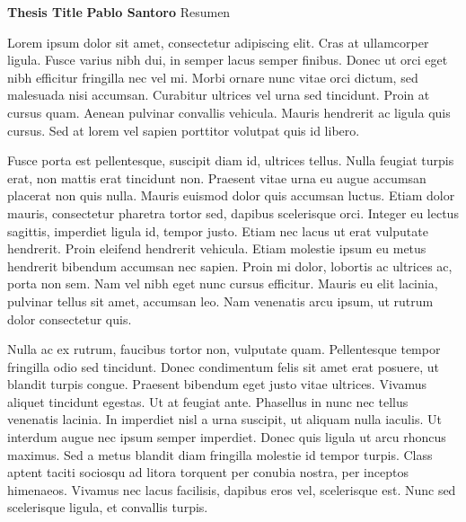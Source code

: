\thispagestyle{plain}
\begin{center}
    \large
    \textbf{Thesis Title}
    \vspace{0.4 cm}
    \textbf{Pablo Santoro}
    \vspace{0.4 cm}
    Resumen
\end{center}
Lorem ipsum dolor sit amet, consectetur adipiscing elit. Cras at ullamcorper ligula. Fusce varius nibh dui, in semper lacus semper finibus. Donec ut orci eget nibh efficitur fringilla nec vel mi. Morbi ornare nunc vitae orci dictum, sed malesuada nisi accumsan. Curabitur ultrices vel urna sed tincidunt. Proin at cursus quam. Aenean pulvinar convallis vehicula. Mauris hendrerit ac ligula quis cursus. Sed at lorem vel sapien porttitor volutpat quis id libero.

Fusce porta est pellentesque, suscipit diam id, ultrices tellus. Nulla feugiat turpis erat, non mattis erat tincidunt non. Praesent vitae urna eu augue accumsan placerat non quis nulla. Mauris euismod dolor quis accumsan luctus. Etiam dolor mauris, consectetur pharetra tortor sed, dapibus scelerisque orci. Integer eu lectus sagittis, imperdiet ligula id, tempor justo. Etiam nec lacus ut erat vulputate hendrerit. Proin eleifend hendrerit vehicula. Etiam molestie ipsum eu metus hendrerit bibendum accumsan nec sapien. Proin mi dolor, lobortis ac ultrices ac, porta non sem. Nam vel nibh eget nunc cursus efficitur. Mauris eu elit lacinia, pulvinar tellus sit amet, accumsan leo. Nam venenatis arcu ipsum, ut rutrum dolor consectetur quis.

Nulla ac ex rutrum, faucibus tortor non, vulputate quam. Pellentesque tempor fringilla odio sed tincidunt. Donec condimentum felis sit amet erat posuere, ut blandit turpis congue. Praesent bibendum eget justo vitae ultrices. Vivamus aliquet tincidunt egestas. Ut at feugiat ante. Phasellus in nunc nec tellus venenatis lacinia. In imperdiet nisl a urna suscipit, ut aliquam nulla iaculis. Ut interdum augue nec ipsum semper imperdiet. Donec quis ligula ut arcu rhoncus maximus. Sed a metus blandit diam fringilla molestie id tempor turpis. Class aptent taciti sociosqu ad litora torquent per conubia nostra, per inceptos himenaeos. Vivamus nec lacus facilisis, dapibus eros vel, scelerisque est. Nunc sed scelerisque ligula, et convallis turpis.

\newpage